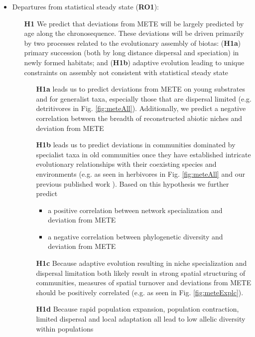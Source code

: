 \documentclass[11pt]{article}
\begin{document}
\begin{itemize}
\item Departures from statistical steady state ({\bf RO1}):
  \begin{itemize}
  \item[{\bf H1}] We predict that deviations from METE will be largely predicted by age along
    the chronosequence. These deviations will be driven primarily by
    two processes related to the evolutionary assembly of biotas: ({\bf H1a})
    primary succession (both by long distance dispersal and
    speciation) in newly formed habitats; and ({\bf H1b}) adaptive evolution
    leading to unique constraints on assembly not consistent with
    statistical steady state
    \begin{itemize}
    \item[{\bf H1a}] leads us to predict deviations from METE on young
      substrates and for generalist taxa, especially those that are
      dispersal limited (e.g. detritivores in Fig. \ref{fig:meteAll}).
      Additionally, we predict a negative correlation between the
      breadth of reconstructed abiotic niches and deviation from METE
    \item[{\bf H1b}] leads us to predict deviations in communities
      dominated by specialist taxa in old communities once they have
      established intricate evolutionary relationships with their
      coexisting species and environments (e.g. as seen in herbivores
      in Fig. \ref{fig:meteAll} and our previous published work
      \citep{rominger2015}). Based on this hypothesis we further
      predict
      \begin{itemize}
      \item a positive correlation between network specialization and
        deviation from METE
      \item a negative correlation between phylogenetic diversity and
        deviation from METE
      \end{itemize}
    \item[{\bf H1c}] Because adaptive evolution resulting in niche
      specialization and dispersal limitation both likely result in
      strong spatial structuring of communities, measures of spatial
      turnover and deviations from METE should be positively
      correlated (e.g. as seen in Fig. \ref{fig:meteExplc}).
    \item[{\bf H1d}] Because rapid population expansion, population
      contraction, limited dispersal and local adaptation all lead to
      low allelic diversity within populations

\end{itemize}
\end{itemize}
\end{itemize}
\end{document}
